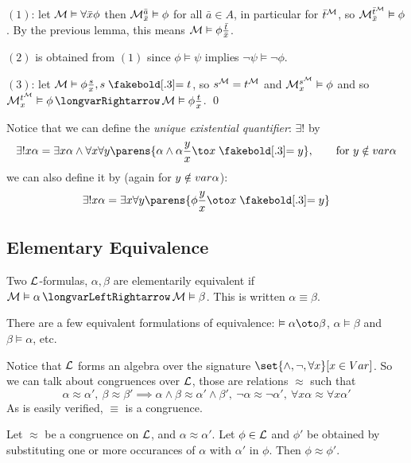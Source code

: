 \ecoro

\Proof $(1)$: let ${\cal M}\vDash\forall\bar x\phi$ then ${\cal M}^{\bar a}_{\bar x}\vDash\phi$ for all $\bar a\in A$, in particular for $\bar t^{{\cal M}}$, so ${\cal M}^{\bar t^{{\cal M}}}_{\bar x}\vDash\phi$.
By the previous lemma, this means ${\cal M}\vDash\phi{{\bar t}\over{\bar x}}$.

$(2)$ is obtained from $(1)$ since $\phi\vDash\psi$ implies $\neg\psi\vDash\neg\phi$.

$(3)$: let $\c M\vDash\phi\frac sx,s\eq t$, so $s^{{\cal M}}=t^{{\cal M}}$ and ${\cal M}^{s^{{\cal M}}}_x\vDash\phi$ and so $\c M^{t^{\c M}}_x\vDash\phi\implies\c M\vDash\phi\frac tx$.
\qed

Notice that we can define the {\it unique existential quantifier}: $\exists!$ by
$$ \exists!x\alpha = \exists x\alpha\land\forall x\forall y\parens{\alpha\land\alpha\frac yx\to x\eq y},\qquad \hbox{for $y\notin\var\alpha$} $$
we can also define it by (again for $y\notin{\sl var}\alpha$):
$$ \exists!x\alpha = \exists x\forall y\parens{\phi\frac yx\oto x\eq y} $$

\subsection{Elementary Equivalence}

\bdefn

    Two ${\cal L}$-formulas, $\alpha,\beta$ are {\emphcolor elementarily equivalent} if $\c M\vDash\alpha\iff\c M\vDash\beta$.
    This is written $\alpha\equiv\beta$.

\edefn

There are a few equivalent formulations of equivalence: $\vDash\alpha\oto\beta$, $\alpha\vDash\beta$ and $\beta\vDash\alpha$, etc.

Notice that ${\cal L}$ forms an algebra over the signature $\set{{\land},{\neg},{\forall x}}[x\in\Var]$.
So we can talk about congruences over ${\cal L}$, those are relations $\approx$ such that
$$ \alpha\approx\alpha',\ \beta\approx\beta' \implies \alpha\land\beta\approx\alpha'\land\beta',\ \neg\alpha\approx\neg\alpha',\ \forall x\alpha\approx\forall x\alpha' $$
As is easily verified, $\equiv$ is a congruence.

\blemm[title=The Replacement Lemma]

    Let $\approx$ be a congruence on ${\cal L}$, and $\alpha\approx\alpha'$.
    Let $\phi\in{\cal L}$ and $\phi'$ be obtained by substituting one or more occurances of $\alpha$ with $\alpha'$ in $\phi$.
    Then $\phi\approx\phi'$.

\elemm

